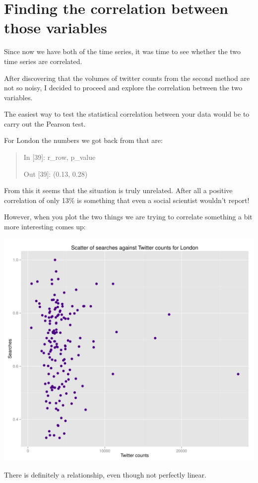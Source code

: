 \documentclass[minf,frontabs,twoside,singlespacing,parskip]{infthesis}
\begin{document}
\section{Finding the correlation between those variables}

Since now we have both of the time series, it was time to see whether the two time series are correlated. 

After discovering that the volumes of twitter counts from the second method are not so noisy, I decided to proceed and explore the correlation between the two variables.

The easiest way to test the statistical correlation between your data would be to carry out the Pearson test.

For London the numbers we got back from that are:
\begin{quotation}
In [39]: r\_row, p\_value

Out [39]: (0.13, 0.28)
\end{quotation}

From this it seems that the situation is truly unrelated. After all a positive correlation of only 13\% is something that even a social scientist wouldn't report!

However, when you plot the two things we are trying to correlate something a bit more interesting comes up:

\includegraphics[width=\textwidth]{London}

There is definitely a relationship, even though not perfectly linear.
\end{document}
